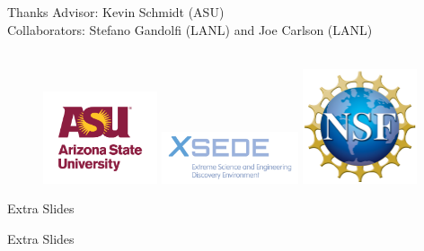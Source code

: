 \documentclass{beamer}
\begin{document}
\begin{frame}{Thanks}
Advisor: Kevin Schmidt (ASU) \\
Collaborators: Stefano Gandolfi (LANL) and Joe Carlson (LANL)
\\~\\
\begin{figure}[h]
   \centering
   \includegraphics[width=0.30\textwidth]{asu_university_vert_rgb_maroongold_150.png}
   \includegraphics[width=0.36\textwidth]{xsede-full-color.jpg}
   \includegraphics[width=0.30\textwidth]{NSF_4-Color_bitmap_Logo.png}
\end{figure}
\end{frame}

\iftrue
\appendix
\begin{frame}{Extra Slides}
\begin{centering}
   Extra Slides
\end{centering}
\end{frame}
\end{document}
